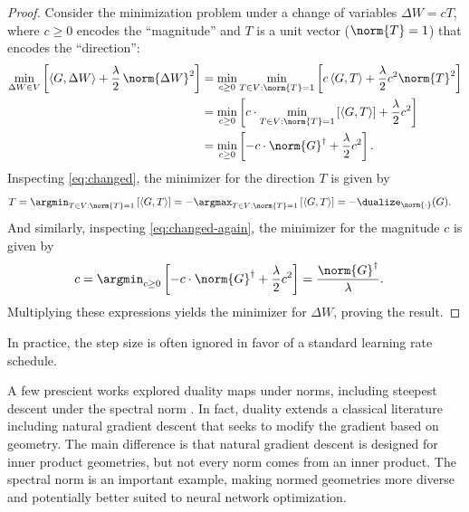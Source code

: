 \begin{proof}
    Consider the minimization problem under a change of variables $\Delta W = c T$, where $c \geq 0$ encodes the ``magnitude'' and $T$ is a unit vector ($\norm{T}=1$) that encodes the ``direction'':
    \begin{align}
        \min_{\Delta W \in V} \left[\langle G, \Delta W \rangle + \frac{\lambda}{2} \, \norm{\Delta W}^2 \right] &= \min_{c \geq 0} \min_{T\in V : \norm{T}=1} \left[c \,\langle G, T \rangle + \frac{\lambda}{2} c^2 \norm{T}^2 \right] \\
        &= \min_{c \geq 0} \left[c \cdot \min_{T\in V : \norm{T}=1} \left[\langle G, T \rangle \right] + \frac{\lambda}{2} c^2 \right] \label{eq:changed} \\
        &= \min_{c \geq 0} \left[ -c \cdot \norm{G}^\dagger + \frac{\lambda}{2} c^2 \right]. \label{eq:changed-again}
    \end{align}
    Inspecting \cref{eq:changed}, the minimizer for the direction $T$ is given by
    \begin{align}
        T &= \argmin_{T\in V : \norm{T}=1} \left[\langle G, T \rangle\right] = - \argmax_{T\in V : \norm{T}=1} \left[\langle G, T \rangle\right] = -\dualize_{\norm{\cdot}}(G).
    \end{align}
    And similarly, inspecting \cref{eq:changed-again}, the minimizer for the magnitude $c$ is given by
    \begin{align}
        c &= \argmin_{c \geq 0} \left[ - c \cdot \norm{G}^\dagger + \frac{\lambda}{2} c^2 \right] = \frac{\norm{G}^\dagger}{\lambda}.
    \end{align}
    Multiplying these expressions yields the minimizer for $\Delta W$, proving the result.
\end{proof}

In practice, the step size is often ignored in favor of a standard learning rate schedule.

A few prescient works explored duality maps under norms, including steepest descent under the spectral norm \citep{spectral-descent-1,spectral-descent-2,spectral-descent-4,flynn2017duality}. In fact, duality extends a classical literature including natural gradient descent that seeks to modify the gradient based on geometry. The main difference is that natural gradient descent is designed for inner product geometries, but not every norm comes from an inner product. The spectral norm is an important example, making normed geometries more diverse and potentially better suited to neural network optimization.

